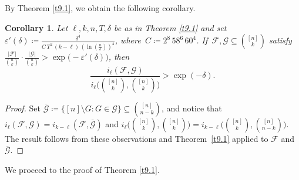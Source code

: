 \documentclass[10pt,a4paper]{amsart}
\newtheorem{cor}[thm]{Corollary}
\theoremstyle{remark}
\newcommand{\ee}{\varepsilon}
\newcommand{\Fcal}{\mathcal{F}}
\newcommand{\Gcal}{\mathcal{G}}
\begin{document}
By Theorem \ref{t9.1}, we obtain the following corollary.
\begin{cor} \label{9.cor.new}
Let $\ell,k,n, T, \delta$ be as in Theorem \emph{\ref{t9.1}} and set
$\ee'(\delta)\coloneqq \frac{\delta^4}{C\, T^2\, (k-\ell)\,(\ln(\frac{n}{\delta}))^4}$,
where\, $C\coloneqq 2^{8}\, 58^6\, 60^4$. If\, $\Fcal, \Gcal\subseteq\binom{[n]}{k}$ satisfy
$\frac{|\Fcal|}{\binom{n}{k}}\cdot\frac{|\Gcal|}{\binom{n}{k}}>\exp\big(-\ee'(\delta)\big)$, then
\begin{equation} \label{en.9.1}
\frac{i_{\ell}(\Fcal,\Gcal)}{i_{\ell}\big(\binom{[n]}{k},\binom{[n]}{k}\big)}> \exp\left(-\delta\right).
\end{equation}
\end{cor}
\begin{proof}
Set $\overline{\Gcal}\coloneqq \big\{[n]\setminus G: G\in \Gcal\big\}\subseteq \binom{[n]}{n-k}$,
and notice that $i_{\ell}(\Fcal,\Gcal)=i_{k-\ell}(\Fcal,\overline{\Gcal})$ and
$i_{\ell}\big(\binom{[n]}{k},\binom{[n]}{k}\big)=i_{k-\ell}\big(\binom{[n]}{k},\binom{[n]}{n-k}\big)$.
The result follows from these observations and Theorem~\ref{t9.1} applied to $\Fcal$ and $\overline{\Gcal}$.
\end{proof}
We proceed to the proof of Theorem \ref{t9.1}.
\end{document}
